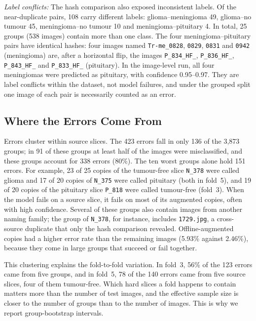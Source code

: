 \documentclass[journal,onecolumn]{IEEEtran}
\newcommand{\fname}[1]{\texttt{#1}}
\begin{document}
\textit{Label conflicts:} The hash comparison also exposed inconsistent labels. Of the near-duplicate pairs, 108 carry different labels: glioma--meningioma 49, glioma--no tumour 45, meningioma--no tumour 10 and meningioma--pituitary 4. In total, 25 groups (538 images) contain more than one class. The four meningioma--pituitary pairs have identical hashes: four images named \fname{Tr-me\_0828}, \fname{0829}, \fname{0831} and \fname{0942} (meningioma) are, after a horizontal flip, the images \fname{P\_834\_HF\_}, \fname{P\_836\_HF\_}, \fname{P\_843\_HF\_} and \fname{P\_833\_HF\_} (pituitary). In the image-level run, all four meningiomas were predicted as pituitary, with confidence 0.95--0.97. They are label conflicts within the dataset, not model failures, and under the grouped split one image of each pair is necessarily counted as an error.

\subsection{Where the Errors Come From}\label{sec:errors}
Errors cluster within source slices. The 423 errors fall in only 136 of the 3,873 groups; in 91 of these groups at least half of the images were misclassified, and these groups account for 338 errors (80\%). The ten worst groups alone hold 151 errors. For example, 23 of 25 copies of the tumour-free slice \fname{N\_378} were called glioma and 17 of 20 copies of \fname{N\_375} were called pituitary (both in fold~5), and 19 of 20 copies of the pituitary slice \fname{P\_818} were called tumour-free (fold~3). When the model fails on a source slice, it fails on most of its augmented copies, often with high confidence. Several of these groups also contain images from another naming family; the group of \fname{N\_378}, for instance, includes \fname{1729.jpg}, a cross-source duplicate that only the hash comparison revealed. Offline-augmented copies had a higher error rate than the remaining images (5.93\% against 2.46\%), because they come in large groups that succeed or fail together.

This clustering explains the fold-to-fold variation. In fold~3, 56\% of the 123 errors came from five groups, and in fold~5, 78 of the 140 errors came from five source slices, four of them tumour-free. Which hard slices a fold happens to contain matters more than the number of test images, and the effective sample size is closer to the number of groups than to the number of images. This is why we report group-bootstrap intervals.
\end{document}
